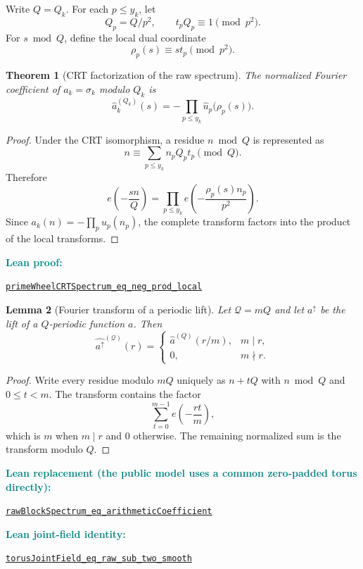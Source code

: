 \documentclass[11pt]{article}
\newtheorem{theorem}{Theorem}[section]
\newtheorem{lemma}[theorem]{Lemma}
\theoremstyle{definition}
\newcommand{\leanxref}[3]{%
  \par\smallskip
  {\small\noindent\textcolor{teal}{\textbf{#1:}}\par
  \noindent\href{#3}{\nolinkurl{#2}}\par}
  \smallskip
}
\begin{document}
Write $Q=Q_k$.  For each $p\le y_k$, let
\[
Q_p=Q/p^2,
\qquad
t_pQ_p\equiv1\pmod{p^2}.
\]
For $s\bmod Q$, define the local dual coordinate
\[
\rho_p(s)\equiv st_p\pmod{p^2}.
\]

\begin{theorem}[CRT factorization of the raw spectrum]\label{thm:raw-crt-spectrum}
The normalized Fourier coefficient of $a_k=\sigma_k$ modulo $Q_k$ is
\begin{equation}\label{eq:raw-factorization}
\widehat a_k^{(Q_k)}(s)
=-\prod_{p\le y_k}\widehat u_p\bigl(\rho_p(s)\bigr).
\end{equation}
\end{theorem}

\begin{proof}
Under the CRT isomorphism, a residue $n\bmod Q$ is represented as
\[
n\equiv\sum_{p\le y_k}n_pQ_pt_p\pmod Q.
\]
Therefore
\[
e\!\left(-\frac{sn}{Q}\right)
=\prod_{p\le y_k}e\!\left(-\frac{\rho_p(s)n_p}{p^2}\right).
\]
Since $a_k(n)=-\prod_pu_p(n_p)$, the complete transform factors into the product of the local transforms.
\end{proof}
\leanxref{Lean proof}{primeWheelCRTSpectrum_eq_neg_prod_local}{https://github.com/OVVO-Financial/prime-wheel-mobius/blob/main/formalization/RHLean/Analysis/PrimeWheelCompleteSpectrum.lean}

\begin{lemma}[Fourier transform of a periodic lift]\label{lem:periodic-lift-transform}
Let $\mathcal Q=mQ$ and let $a^{\uparrow}$ be the lift of a $Q$-periodic function $a$.  Then
\[
\widehat{a^{\uparrow}}^{(\mathcal Q)}(r)
=
\begin{cases}
\widehat a^{(Q)}(r/m),&m\mid r,\\
0,&m\nmid r.
\end{cases}
\]
\end{lemma}

\begin{proof}
Write every residue modulo $mQ$ uniquely as $n+tQ$ with $n\bmod Q$ and $0\le t<m$.  The transform contains the factor
\[
\sum_{t=0}^{m-1}e\!\left(-\frac{rt}{m}\right),
\]
which is $m$ when $m\mid r$ and $0$ otherwise.  The remaining normalized sum is the transform modulo $Q$.
\end{proof}
\leanxref{Lean replacement (the public model uses a common zero-padded torus directly)}{rawBlockSpectrum_eq_arithmeticCoefficient}{https://github.com/OVVO-Financial/prime-wheel-mobius/blob/main/formalization/RHLean/Analysis/PrimeWheelArithmeticSpectrum.lean}
\leanxref{Lean joint-field identity}{torusJointField_eq_raw_sub_two_smooth}{https://github.com/OVVO-Financial/prime-wheel-mobius/blob/main/formalization/RHLean/Analysis/PrimeWheelJointSpectrum.lean}
\end{document}
